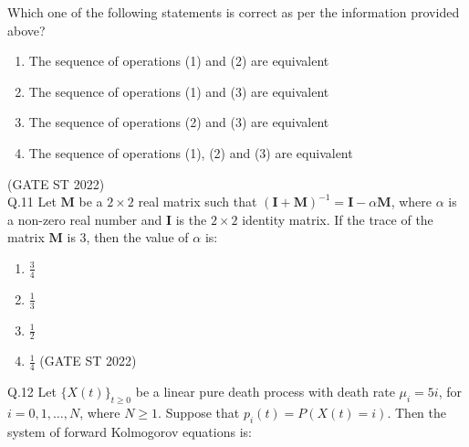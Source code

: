 \documentclass[journal,12pt,onecolumn]{IEEEtran}
\theoremstyle{remark}
\begin{document}
	 Which one of the following statements is correct as per the information provided above?\\[0.5em]
	  \begin{multicols}{2}
	 \begin{enumerate}[label=(\Alph*)]
	 	\item The sequence of operations (1) and (2) are equivalent
	 	\item The sequence of operations (1) and (3) are equivalent
	 	\item The sequence of operations (2) and (3) are equivalent
	 	\item The sequence of operations (1), (2) and (3) are equivalent
	 \end{enumerate}
	\end{multicols}
	 \hfill (GATE ST 2022)
	 \vspace{2em}
	 \\
Q.11 Let $\mathbf{M}$ be a $2 \times 2$ real matrix such that 
$(\mathbf{I} + \mathbf{M})^{-1} = \mathbf{I} - \alpha \mathbf{M}$, 
where $\alpha$ is a non-zero real number and $\mathbf{I}$ is the $2 \times 2$ identity matrix. 
If the trace of the matrix $\mathbf{M}$ is $3$, then the value of $\alpha$ is:
\begin{multicols}{4}
\begin{enumerate}[label=\alph*.] 
	\item $\frac{3}{4}$
	\item $\frac{1}{3}$
	\item $\frac{1}{2}$
	\item $\frac{1}{4}$
	\hfill (GATE ST 2022)
\end{enumerate}
\end{multicols}
	\vspace{2em}
Q.12 Let $ \{X(t)\}_{t\geq0} $ be a linear pure death process with death rate $\mu_i = 5i$, for $i = 0, 1, \dots , N$, where $N \geq 1$. Suppose that $p_i(t) = P(X(t) = i)$. Then the system of forward Kolmogorov equations is:\\
\end{document}

